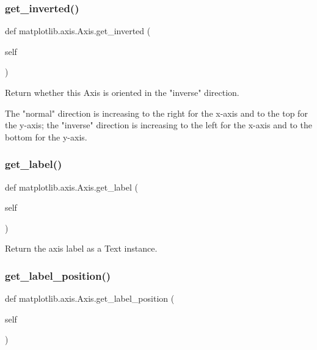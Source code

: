\subsubsection{\texorpdfstring{get\+\_\+inverted()}{get\_inverted()}}
{\footnotesize\ttfamily def matplotlib.\+axis.\+Axis.\+get\+\_\+inverted (\begin{DoxyParamCaption}\item[{}]{self }\end{DoxyParamCaption})}

\begin{DoxyVerb}Return whether this Axis is oriented in the "inverse" direction.

The "normal" direction is increasing to the right for the x-axis and to
the top for the y-axis; the "inverse" direction is increasing to the
left for the x-axis and to the bottom for the y-axis.
\end{DoxyVerb}
 \mbox{\label{classmatplotlib_1_1axis_1_1Axis_a8f3244a4685677397145ebd30bf7d67f}} 
\subsubsection{\texorpdfstring{get\+\_\+label()}{get\_label()}}
{\footnotesize\ttfamily def matplotlib.\+axis.\+Axis.\+get\+\_\+label (\begin{DoxyParamCaption}\item[{}]{self }\end{DoxyParamCaption})}

\begin{DoxyVerb}Return the axis label as a Text instance.\end{DoxyVerb}
 \mbox{\label{classmatplotlib_1_1axis_1_1Axis_a5f818539c66ae6ac56f68bf43fdbc0c7}} 
\subsubsection{\texorpdfstring{get\+\_\+label\+\_\+position()}{get\_label\_position()}}
{\footnotesize\ttfamily def matplotlib.\+axis.\+Axis.\+get\+\_\+label\+\_\+position (\begin{DoxyParamCaption}\item[{}]{self }\end{DoxyParamCaption})}

